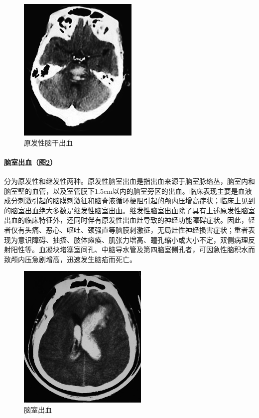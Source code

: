 \begin{figure}[!htbp]
 \centering
 \includegraphics[width=2.25in,height=2.75in]{./images/Image00381.jpg}
 \captionsetup{justification=centering}
 \caption{原发性脑干出血}
 \label{fig84-6}
  \end{figure} 

\paragraph{脑室出血（图\ref{fig84-7}）}

分为原发性和继发性两种。原发性脑室出血是指出血来源于脑室脉络丛，脑室内和脑室壁的血管，以及室管膜下1.5cm以内的脑室旁区的出血。临床表现主要是血液成分刺激引起的脑膜刺激征和脑脊液循环梗阻引起的颅内压增高症状；临床上见到的脑室出血绝大多数是继发性脑室出血。继发性脑室出血除了具有上述原发性脑室出血的临床特征外，还同时伴有原发性出血灶导致的神经功能障碍症状。因此，轻者仅有头痛、恶心、呕吐、颈强直等脑膜刺激征，无局灶性神经损害症状；重者表现为意识障碍、抽搐、肢体瘫痪、肌张力增高、瞳孔缩小或大小不定，双侧病理反射阳性等。血凝块堵塞室间孔、中脑导水管及第四脑室侧孔者，可因急性脑积水而致颅内压急剧增高，迅速发生脑疝而死亡。

\begin{figure}[!htbp]
 \centering
 \includegraphics[width=2.44792in,height=2.75in]{./images/Image00382.jpg}
 \captionsetup{justification=centering}
 \caption{脑室出血}
 \label{fig84-7}
  \end{figure} 

